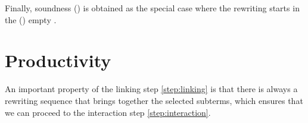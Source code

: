\begin{scope}
Finally, soundness () is obtained as the special
case where the rewriting starts in the () empty .






\section{Productivity}

An important property of the linking step \ref{step:linking} is that there is
always a rewriting sequence that brings together the selected subterms, which
ensures that we can proceed to the interaction step \ref{step:interaction}.



\end{scope}
